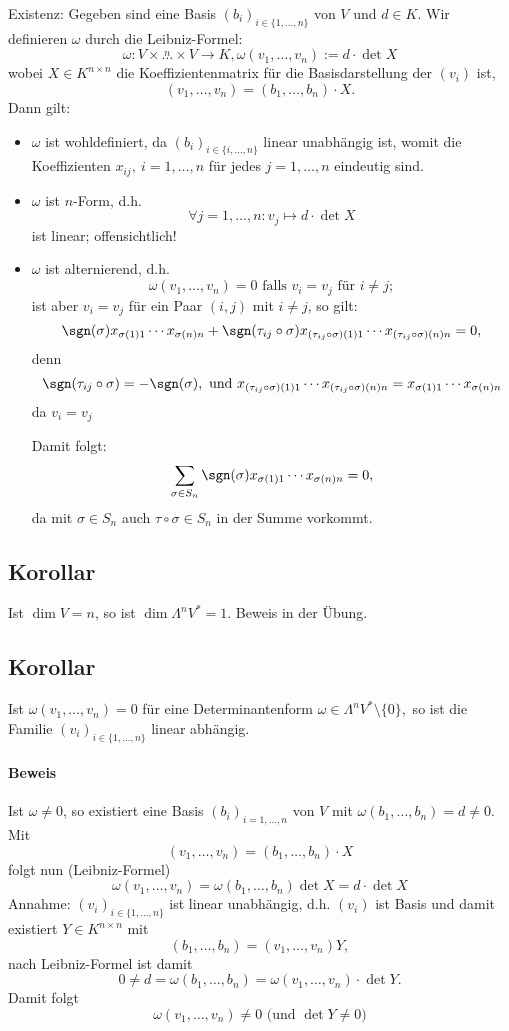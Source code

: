 	Existenz: Gegeben sind eine Basis $ (b_i)_{i\in \{1,\dots, n\}} $ von $ V $ und $ d\in K $. Wir definieren $ \omega $ durch die Leibniz-Formel:
		\[ \omega: V\times \overset{n}{\dots} \times V \to K, \omega(v_1,\dots,v_n):=d\cdot\det X \]
	wobei $ X\in K^{n\times n} $ die Koeffizientenmatrix für die Basisdarstellung der $ (v_i) $ ist,
		\[ (v_1,\dots,v_n)=(b_1,\dots,b_n)\cdot X. \]
	Dann gilt:
		\begin{itemize}
			\item $ \omega $ ist wohldefiniert, da $ (b_i)_{i\in \{i,\dots,n\}} $ linear unabhängig ist, womit die Koeffizienten $ x_{ij},\ i=1,\dots,n $ für jedes $ j=1,\dots,n $ eindeutig sind.
			\item $ \omega $ ist $ n $-Form, d.h.
				\[ \forall j=1,\dots,n: v_j\mapsto d\cdot\det X\]
			ist linear; offensichtlich!
			\item $ \omega $ ist alternierend, d.h.
				\[ \omega(v_1,\dots,v_n)=0\text{ falls } v_i = v_j \text{ für }i\neq j; \]
			ist aber $ v_i = v_j $ für ein Paar $ (i,j) $ mit $ i\neq j $, so gilt:
				\[ \sgn(\sigma)x_{\sigma(1)1}\cdots x_{\sigma(n)n} + \sgn(\tau_{ij}\circ \sigma) x_{(\tau_{ij}\circ \sigma)(1)1}\cdots x_{(\tau_{ij}\circ \sigma)(n)n} = 0,  \]
			denn
				\[ \sgn(\tau_{ij}\circ \sigma) = -\sgn(\sigma),\text{ und } x_{(\tau_{ij}\circ\sigma)(1)1}\cdots x_{(\tau_{ij}\circ\sigma)(n)n} = x_{\sigma(1)1}\cdots x_{\sigma(n)n} \]
			da $ v_i = v_j $
			
			Damit folgt:
				\[ \sum_{\sigma\in S_n}\sgn(\sigma)x_{\sigma(1)1}\cdots x_{\sigma(n)n}=0, \]
			da mit $ \sigma\in S_n $ auch $ \tau\circ\sigma\in S_n $ in der Summe vorkommt.
		\end{itemize}	
\subsection{Korollar}
	\begin{Korollar}
		Ist $ \dim V = n $, so ist $ \dim\Lambda^nV^* = 1 $. Beweis in der Übung.
	\end{Korollar}
\subsection{Korollar}
	Ist $ \omega(v_1,\dots,v_n)=0 $ für eine Determinantenform $ \omega\in\Lambda^nV^*\setminus\{0\}, $ so ist die Familie $ (v_i)_{i\in \{1,\dots, n\}} $ linear abhängig.
\paragraph{Beweis}
	Ist $ \omega\neq 0 $, so existiert eine Basis $ (b_i)_{i=1,\dots,n} $ von $ V $ mit $ \omega(b_1,\dots,b_n)=d\neq 0 $. Mit
		\[ (v_1,\dots,v_n)=(b_1,\dots,b_n)\cdot X \]
	folgt nun (Leibniz-Formel)
		\[ \omega(v_1,\dots,v_n)=\omega(b_1,\dots,b_n)\det X = d\cdot \det X \]
	Annahme: $ (v_i)_{i\in \{1,\dots,n\}} $ ist linear unabhängig, d.h. $ (v_i) $ ist Basis und damit existiert $ Y\in K^{n\times n} $ mit
		\[ (b_1,\dots,b_n)=(v_1,\dots,v_n)Y, \]
	nach Leibniz-Formel ist damit
		\[ 0\neq d = \omega(b_1,\dots,b_n)=\omega(v_1,\dots,v_n)\cdot \det Y. \]
	Damit folgt
		\[ \omega(v_1,\dots,v_n)\neq 0 \text{ (und }\det Y \neq 0) \]
